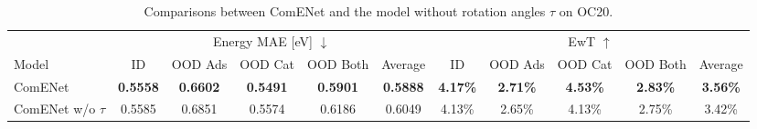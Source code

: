 \documentclass{article}
\begin{document}
\begin{table*}[ht]
\vspace{-5 pt}
    \begin{center}
        \caption{Comparisons between ComENet and the model without rotation angles $\tau$ on OC20.
        }
        \vspace{-5 pt}
    \label{tb:ablation_oc20}
    \resizebox{\textwidth}{!}
{\color{COLOR}\begin{tabular}{l | ccccc | ccccc  }
    \toprule
    &\multicolumn{5}{c|}{Energy MAE [eV] $\downarrow$} & \multicolumn{5}{c}{EwT $\uparrow$}  \\
    \cmidrule(l{4pt}r{4pt}){2-6}
    \cmidrule(l{4pt}r{4pt}){7-11}
Model & ID &  OOD Ads & OOD Cat & OOD Both &Average& ID &  OOD Ads & OOD Cat & OOD Both &Average\\
\midrule
ComENet &\textbf{0.5558} &\textbf{0.6602} &\textbf{0.5491} &\textbf{0.5901} &\textbf{0.5888} &\textbf{4.17\%} &\textbf{2.71\%} & \textbf{4.53\%} &\textbf{2.83\%} & \textbf{3.56\%} \\
ComENet w/o $\tau$ & 0.5585 & 0.6851 & 0.5574 & 0.6186 & 0.6049 & 4.13\% & 2.65\% & 4.13\% & 2.75\% & 3.42\% \\
\bottomrule
\end{tabular}}
\end{center}
\vspace{-10 pt}
\end{table*}
\end{document}
